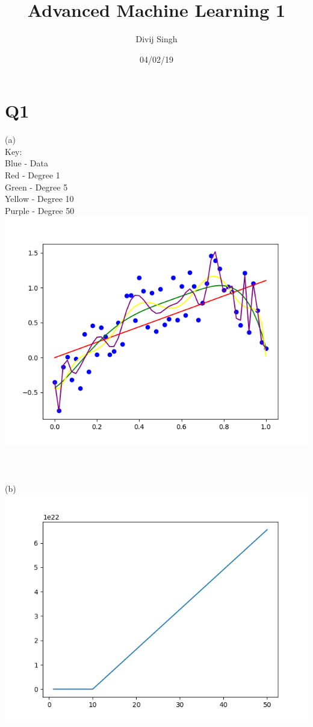 \documentclass{article}
\title{Advanced Machine Learning 1}
\author{Divij Singh}
\date{04/02/19}
\begin{document}
	\maketitle
	
	\section{Q1}
(a)\\
Key:\\
Blue - Data\\
Red - Degree 1\\
Green - Degree 5\\
Yellow - Degree 10\\
Purple - Degree 50\\

\includegraphics[scale = 0.75]{1.png}
\\\\\\\\
(b)\\
\includegraphics[scale = 0.75]{2.png}
\end{document}
